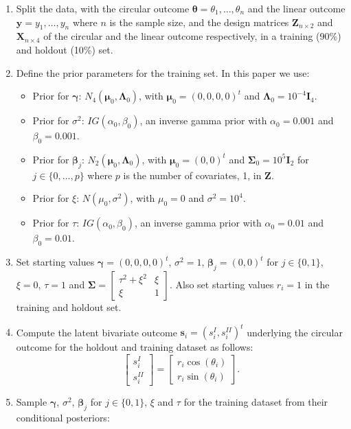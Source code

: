\documentclass[12pt,]{article}
\begin{document}
\begin{enumerate}
\item Split the data, with the circular outcome $\boldsymbol{\theta} = \theta_1, \dots, \theta_n$ and the linear outcome $\boldsymbol{y} = y_1, \dots, y_n$ where $n$ is the sample size, and the design matrices $\boldsymbol{Z}_{n \times 2}$  and $\boldsymbol{X}_{n \times 4}$ of the circular and the linear outcome respectively, in a training (90\%) and holdout (10\%) set. 
\item Define the prior parameters for the training set. In this paper we use:

\begin{itemize}
\item Prior for $\boldsymbol{\gamma}$: $N_4(\boldsymbol{\mu}_{0}, \boldsymbol{\Lambda}_{0})$, with $\boldsymbol{\mu}_{0} = (0,0,0,0)^t$ and $\boldsymbol{\Lambda}_{0} = 10^{-4}\boldsymbol{I}_4$.
\item Prior for $\sigma^2$: $IG(\alpha_{0}, \beta_{0})$, an inverse gamma prior with $\alpha_{0} = 0.001$ and $\beta_{0} = 0.001$.
\item Prior for $\boldsymbol{\beta}_{j}$: $N_2(\boldsymbol{\mu}_{0}, \boldsymbol{\Lambda}_0)$, with $\boldsymbol{\mu}_{0} = (0,0)^t$ and  $\boldsymbol{\Sigma}_{0} = 10^{5}\boldsymbol{I}_2$ for $j \in \{0, \dots, p\}$ where $p$ is the number of covariates, 1, in $\boldsymbol{Z}$.
\item Prior for $\xi$: $N(\mu_0, \sigma^2)$, with $\mu_0 = 0$ and $\sigma^2 = 10^{4}$.
\item Prior for $\tau$: $IG(\alpha_{0}, \beta_{0})$, an inverse gamma prior with $\alpha_{0} = 0.01$ and $\beta_{0} = 0.01$.
\end{itemize}

\item Set starting values $\boldsymbol{\gamma} = (0,0,0,0)^t$, $\sigma^2 = 1$, $\boldsymbol{\beta}_j = (0,0)^t$ for $j \in \{0,1\}$, $\xi = 0$, $\tau = 1$ and $\boldsymbol{\Sigma} = \begin{bmatrix} \tau^2 + \xi^2 & \xi\\ \xi & 1 \end{bmatrix}$. Also set starting values $r_i = 1$ in the training and holdout set. 
\item Compute the latent bivariate outcome $\boldsymbol{s}_i = (s_i^{I}, s_i^{II})^t$ underlying the circular outcome for the holdout and training dataset as follows:
$$\begin{bmatrix} s^{I}_{i} \\ s^{II}_{i} \end{bmatrix} = \begin{bmatrix} r_i \cos (\theta_i) \\  r_i\sin (\theta_i)\end{bmatrix}.$$
\item Sample $\boldsymbol{\gamma}$, $\sigma^2$, $\boldsymbol{\beta}_j$ for $j \in \{0,1\}$, $\xi$ and $\tau$ for the training dataset from their conditional posteriors:


\end{enumerate}
\end{document}
